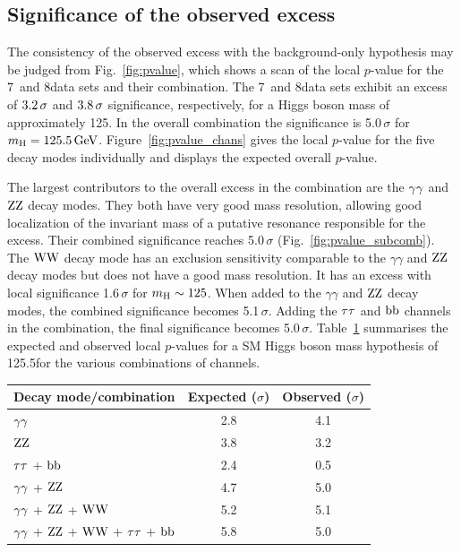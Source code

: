 \documentclass[11pt,twoside,a4paper,cmspaper,final]{cms-tdr}
\begin{document}
\subsection{Significance of the observed excess}

The consistency of the observed excess with the background-only hypothesis may be judged from
Fig.~\ref{fig:pvalue}, which shows a scan of the
local $p$-value for the 7~and 8\TeV data sets
and their combination.
The 7~and 8\TeV data sets
exhibit an excess of $3.2 \,\sigma$ and ${\relax3.8} \,\sigma$ significance, respectively,
for a Higgs boson mass of approximately 125\GeV.
In the overall combination the significance is 5.0\,$\sigma$ for $m_{\mathrm{H}}=125.5\,\text{Ge\hspace{-.08em}V}$.
Figure~\ref{fig:pvalue_chans} gives the local $p$-value for the five
decay modes individually and displays the expected overall $p$-value.

The largest contributors to the overall excess in the combination
are the $\gamma\gamma$ and $\mathrm{Z}\mathrm{Z}$ decay modes. They both have very good
mass resolution, allowing good localization of the invariant mass of
a putative resonance responsible for the excess. Their combined
significance reaches 5.0\,$\sigma$ (Fig.~\ref{fig:pvalue_subcomb}).
The $\mathrm{W}\mathrm{W}$ decay mode has an exclusion sensitivity  comparable to the
$\gamma\gamma$ and $\mathrm{Z}\mathrm{Z}$ decay modes
but does not have a good mass resolution.
It has an excess with
local significance 1.6\,$\sigma$ for $m_{\mathrm{H}}\sim 125$\GeV. When added to
the $\gamma\gamma$ and $\mathrm{Z}\mathrm{Z}$ decay modes, the combined significance
becomes 5.1\,$\sigma$.
Adding the $\tau\tau$ and $\mathrm{b}\mathrm{b}$ channels  in the combination, the final
significance becomes 5.0\,$\sigma$.
Table~\ref{tab:Signif} summarises the expected and observed local $p$-values for a SM Higgs boson mass
hypothesis of 125.5\GeV for the various combinations of channels.

\begin{table}[htbp]
\begin{center}
\label{tab:Signif}
\begin{tabular}{l|c|c}
\hline
Decay mode/combination & Expected ($\sigma$) & Observed ($\sigma$) \\
\hline\hline
$\gamma\gamma$ & 2.8 & 4.1 \\ %
$\mathrm{Z}\mathrm{Z}$  &  3.8 & 3.2 \\ %
\hline
$\tau\tau$ + $\mathrm{b}\mathrm{b}$ & 2.4 & 0.5 \\
$\gamma\gamma$ + $\mathrm{Z}\mathrm{Z}$ & 4.7 & 5.0 \\
$\gamma\gamma$ + $\mathrm{Z}\mathrm{Z}$ + $\mathrm{W}\mathrm{W}$ & 5.2 & 5.1 \\ %
$\gamma\gamma$ + $\mathrm{Z}\mathrm{Z}$ + $\mathrm{W}\mathrm{W}$ + $\tau\tau$ + $\mathrm{b}\mathrm{b}$ & 5.8 & 5.0 \\%
\hline
\end{tabular}
\end{center}
\end{table}
\end{document}
